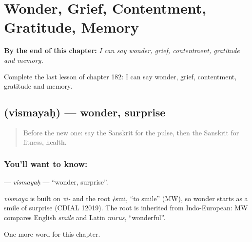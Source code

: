 
\chapter{Wonder, Grief, Contentment, Gratitude, Memory}
\label{ch:sa-wonder-grief-contentment-gratitude-memory}

\begin{chapteropening}
\textbf{By the end of this chapter:} \emph{I can say wonder, grief, contentment, gratitude and memory.}

Complete the last lesson of chapter 182: I can say wonder, grief, contentment, gratitude and memory.
\end{chapteropening}

\section[\texorpdfstring{\sk{विस्मयः} (vismayaḥ)}{विस्मयः (vismayaḥ)}]{ (vismayaḥ) — wonder, surprise}

\label{lesson:SA-C182-vismayah}



\begin{quote}
Before the new one: say the Sanskrit for the pulse, then the Sanskrit for fitness, health.
\end{quote}

\subsection*{You'll want to know: }
\textbf{} — \emph{vismayaḥ} — \textquotedblleft{}wonder, surprise\textquotedblright{}.

\begin{cousinweb}
\emph{vismaya} is built on \emph{vi-} and the root √smi, \textquotedblleft{}to smile\textquotedblright{} (MW), so wonder starts as a smile of surprise (CDIAL 12019). The root is inherited from Indo-European: MW compares English \emph{smile} and Latin \emph{mīrus}, \textquotedblleft{}wonderful\textquotedblright{}.
\end{cousinweb}

\begin{grammarlens}[title={What you've built}]
One more word for this chapter.
\end{grammarlens}

